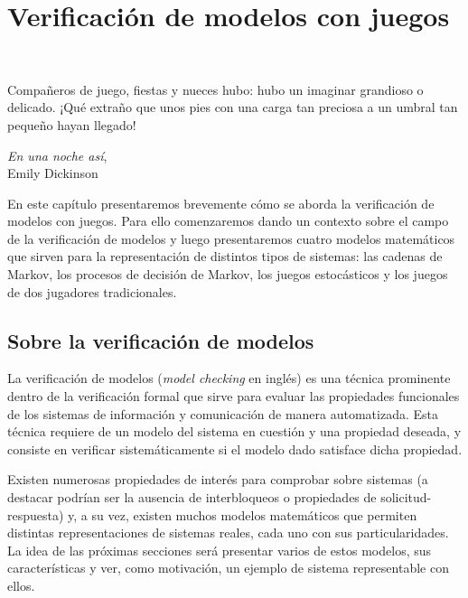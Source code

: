 \chapter{Verificación de modelos con juegos}
~\label{cap:modelos}
\vspace{-1cm}

\epigraph{Compañeros de juego, fiestas y nueces hubo: hubo un imaginar grandioso o delicado. ¡Qué extraño que unos pies con una carga tan preciosa a un umbral tan pequeño hayan llegado!}{\textit{En una noche así}, \\ Emily Dickinson}

En este capítulo presentaremos brevemente cómo se aborda la verificación de
modelos con juegos. Para ello comenzaremos dando un contexto sobre el campo de
la verificación de modelos y luego presentaremos cuatro modelos matemáticos que
sirven para la representación de distintos tipos de sistemas: las cadenas de
Markov, los procesos de decisión de Markov, los juegos estocásticos y los
juegos de dos jugadores tradicionales.


\section{Sobre la verificación de modelos}

La verificación de modelos (\textit{model checking} en inglés) es una técnica
prominente dentro de la verificación formal que sirve para evaluar las
propiedades funcionales de los sistemas de información y comunicación de manera
automatizada. Esta técnica requiere de un modelo del sistema en cuestión y una
propiedad deseada, y consiste en verificar sistemáticamente si el modelo dado
satisface dicha propiedad.

Existen numerosas propiedades de interés para comprobar sobre sistemas (a
destacar podrían ser la ausencia de interbloqueos o propiedades de
solicitud-respuesta) y, a su vez, existen muchos modelos matemáticos que
permiten distintas representaciones de sistemas reales, cada uno con sus
particularidades. La idea de las próximas secciones será presentar varios de
estos modelos, sus características y ver, como motivación, un ejemplo de
sistema representable con ellos.

